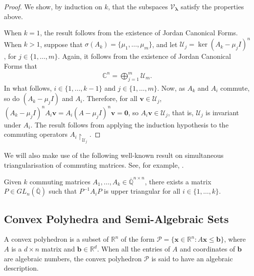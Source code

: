 \begin{proof}
We show, by induction on $k$, that the subspaces $\mathcal{V}_{\boldsymbol{\lambda}}$ satisfy the properties above.

When $k = 1$, the result follows from the existence of Jordan Canonical Forms. When $k > 1$, suppose that $\sigma(A_{k}) = \lbrace \mu_{1}, \ldots, \mu_{m} \rbrace$, and let $\mathcal{U}_{j} = \ker(A_{k} - \mu_{j} I)^{n}$, for $j \in \lbrace 1, \ldots, m \rbrace$. Again, it follows from the existence of Jordan Canonical Forms that
\begin{align*}
\mathbb{C}^{n} = \bigoplus \limits_{j = 1}^{m} \mathcal{U}_{m} .
\end{align*}
In what follows, $i \in \lbrace 1, \ldots, k-1 \rbrace$ and $j \in \lbrace 1, \ldots, m \rbrace$. Now, as $A_{k}$ and $A_{i}$ commute, so do $(A_{k}-\mu_{j} I)$ and $A_{i}$. Therefore, for all $\boldsymbol{v} \in \mathcal{U}_{j}$, $(A_{k} - \mu_{j} I)^{n} A_{i} \boldsymbol{v} = A_{i} (A-\mu_{j} I)^{n} \boldsymbol{v} = \boldsymbol{0}$, so $A_{i} \boldsymbol{v} \in \mathcal{U}_{j}$, that is, $\mathcal{U}_{j}$ is invariant under $A_{i}$. The result follows from applying the induction hypothesis to the commuting operators $A_{i} \restriction_{\mathcal{U}_{j}}$.
\end{proof}

We will also make use of the following well-known result on simultaneous triangularisation of commuting matrices. See, for example, \cite{CommutingMatrices}.

\begin{theorem}
\label{simultaneous-triangularisation}
Given $k$ commuting matrices $A_{1}, \ldots, A_{k} \in \overline{\mathbb{Q}}^{n \times n}$, there exists a matrix $P \in \mathit{GL}_{n}(\overline{\mathbb{Q}})$ such that $P^{-1}A_{i}P$ is upper triangular for all $i \in \lbrace 1, \ldots, k \rbrace$.
\end{theorem}

\subsection{Convex Polyhedra and Semi-Algebraic Sets}

A convex polyhedron is a subset of $\mathbb{R}^{n}$ of the form $\mathcal{P} = \lbrace \boldsymbol{x} \in \mathbb{R}^{n} : A \boldsymbol{x} \leq \boldsymbol{b} \rbrace$, where $A$ is a $d \times n$ matrix and $\boldsymbol{b} \in \mathbb{R}^{d}$. When all the entries of $A$ and coordinates of $\boldsymbol{b}$ are algebraic numbers, the convex polyhedron $\mathcal{P}$ is said to have an algebraic description.


